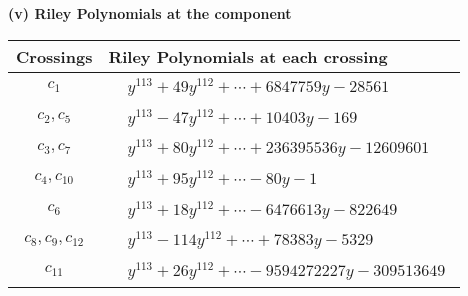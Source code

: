 \documentclass[1p]{elsarticle_modified}
\theoremstyle{definition}
\begin{document}
\newpage\renewcommand{\arraystretch}{1}
\flushleft \textbf{(v) Riley Polynomials at the component}\newline \\
\begin{tabular}{m{50pt}|m{274pt}}
Crossings & \hspace{64pt}Riley Polynomials at each crossing \\
\hline $$\begin{aligned}c_{1}\end{aligned}$$&$\begin{aligned}
&y^{113}+49 y^{112}+\cdots+6847759 y-28561
\end{aligned}$\\
\hline $$\begin{aligned}c_{2},c_{5}\end{aligned}$$&$\begin{aligned}
&y^{113}-47 y^{112}+\cdots+10403 y-169
\end{aligned}$\\
\hline $$\begin{aligned}c_{3},c_{7}\end{aligned}$$&$\begin{aligned}
&y^{113}+80 y^{112}+\cdots+236395536 y-12609601
\end{aligned}$\\
\hline $$\begin{aligned}c_{4},c_{10}\end{aligned}$$&$\begin{aligned}
&y^{113}+95 y^{112}+\cdots-80 y-1
\end{aligned}$\\
\hline $$\begin{aligned}c_{6}\end{aligned}$$&$\begin{aligned}
&y^{113}+18 y^{112}+\cdots-6476613 y-822649
\end{aligned}$\\
\hline $$\begin{aligned}c_{8},c_{9},c_{12}\end{aligned}$$&$\begin{aligned}
&y^{113}-114 y^{112}+\cdots+78383 y-5329
\end{aligned}$\\
\hline $$\begin{aligned}c_{11}\end{aligned}$$&$\begin{aligned}
&y^{113}+26 y^{112}+\cdots-9594272227 y-309513649
\end{aligned}$\\
\hline
\end{tabular}\\~\\
\end{document}
